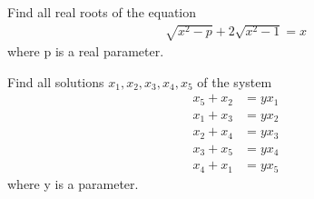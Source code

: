 \item Find all real roots of the equation
\begin{align}
 \sqrt{x^2 - p} + 2\sqrt{x^2 - 1} = x
\end{align}
where p is a real parameter.

\item Find all solutions $x_1, x_2, x_3, x_4, x_5$ of the system
\begin{align}
x_5 + x_2 &= yx_1\\
x_1 + x_3 &= yx_2\\
x_2 + x_4 &= yx_3\\
x_3 + x_5 &= yx_4\\
x_4 + x_1 &= yx_5
\end{align}
where y is a parameter.
    
